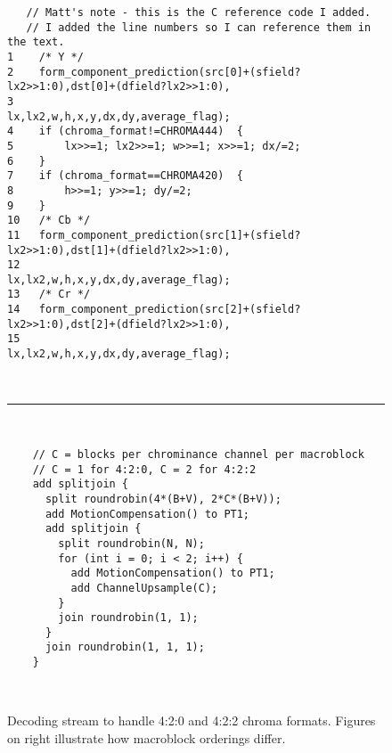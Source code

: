 \begin{figure*}[t]
 \begin{minipage}[t]{4.3in}
   {
    \begin{scriptsize}
    \begin{verbatim}
   // Matt's note - this is the C reference code I added.
   // I added the line numbers so I can reference them in the text.
1    /* Y */
2    form_component_prediction(src[0]+(sfield?lx2>>1:0),dst[0]+(dfield?lx2>>1:0),
3                              lx,lx2,w,h,x,y,dx,dy,average_flag);
4    if (chroma_format!=CHROMA444)  {
5        lx>>=1; lx2>>=1; w>>=1; x>>=1; dx/=2;
6    }
7    if (chroma_format==CHROMA420)  {
8        h>>=1; y>>=1; dy/=2;
9    }
10   /* Cb */
11   form_component_prediction(src[1]+(sfield?lx2>>1:0),dst[1]+(dfield?lx2>>1:0),
12                             lx,lx2,w,h,x,y,dx,dy,average_flag);
13   /* Cr */
14   form_component_prediction(src[2]+(sfield?lx2>>1:0),dst[2]+(dfield?lx2>>1:0),
15                             lx,lx2,w,h,x,y,dx,dy,average_flag);    
    \end{verbatim}
    \end{scriptsize}
   }
  \end{minipage}
    ~~\hrule~~
 \begin{minipage}[t]{4.3in}
   {
    \begin{scriptsize}
    \begin{verbatim}
    // C = blocks per chrominance channel per macroblock 
    // C = 1 for 4:2:0, C = 2 for 4:2:2
    add splitjoin {
      split roundrobin(4*(B+V), 2*C*(B+V));
      add MotionCompensation() to PT1;
      add splitjoin {
        split roundrobin(N, N);
        for (int i = 0; i < 2; i++) {
          add MotionCompensation() to PT1;
          add ChannelUpsample(C);
        }
        join roundrobin(1, 1);
      }
      join roundrobin(1, 1, 1);
    }
    \end{verbatim}
    \end{scriptsize}
   }
  \end{minipage}
  ~~\vrule~~
  \begin{minipage}[t]{2.0in}
  {
   \begin{center}
   \end{center}
  }
  \end{minipage}
  \caption{Decoding stream to handle 4:2:0 and 4:2:2 chroma
    formats. Figures on right illustrate how macroblock orderings
    differ.}
  \label{fig:chroma}
\end{figure*}